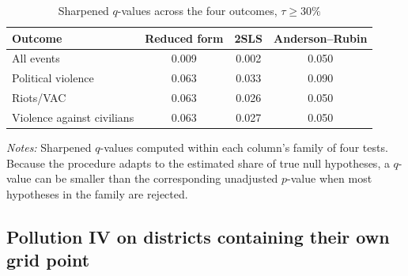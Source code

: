 \documentclass[12pt]{article}
\begin{document}
\begin{table}[H]
\centering
\caption{Sharpened $q$-values across the four outcomes, $\tau \geq 30\%$}
\label{tab:qvalues}
\begin{tabular}{lccc}
\toprule
Outcome & Reduced form & 2SLS & Anderson--Rubin \\
\midrule
All events                 & 0.009 & 0.002 & 0.050 \\
Political violence         & 0.063 & 0.033 & 0.090 \\
Riots/VAC                  & 0.063 & 0.026 & 0.050 \\
Violence against civilians & 0.063 & 0.027 & 0.050 \\
\bottomrule
\end{tabular}
\begin{minipage}{0.85\textwidth}
\vspace{4pt}
\footnotesize \emph{Notes:} Sharpened $q$-values \citep{benjamini2006adaptive,anderson2008multiple} computed within each column's family of four tests. Because the procedure adapts to the estimated share of true null hypotheses, a $q$-value can be smaller than the corresponding unadjusted $p$-value when most hypotheses in the family are rejected.
\end{minipage}
\end{table}

\subsection{Pollution IV on districts containing their own grid point}
\label{sec:owngrid}
\end{document}
